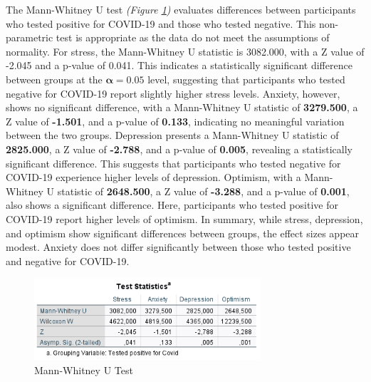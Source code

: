 \documentclass[a4paper]{article}
\begin{document}
\vspace{3em}\noindent
The Mann-Whitney U test \textit{(Figure \ref{fig:mannWhitney})} evaluates differences between participants who tested positive for COVID-19 and those who tested negative. This non-parametric test is appropriate as the data do not meet the assumptions of normality.
\vspace{0.5em}\newline
For stress, the Mann-Whitney U statistic is 3082.000, with a Z value of -2.045 and a p-value of 0.041. This indicates a statistically significant difference between groups at the \(\boldsymbol{\alpha =0.05}\) level,
suggesting that participants who tested negative for COVID-19 report slightly higher stress levels.
\vspace{0.5em}\newline
Anxiety, however, shows no significant difference, with a Mann-Whitney U statistic of \textbf{3279.500}, a Z value of \textbf{-1.501}, and a p-value of \textbf{0.133}, indicating no meaningful variation between the two groups.
Depression presents a Mann-Whitney U statistic of \textbf{2825.000}, a Z value of \textbf{-2.788}, and a p-value of \textbf{0.005}, revealing a statistically significant difference.
This suggests that participants who tested negative for COVID-19 experience higher levels of depression.
\vspace{0.5em}\newline
Optimism, with a Mann-Whitney U statistic of \textbf{2648.500}, a Z value of \textbf{-3.288}, and a p-value of \textbf{0.001}, also shows a significant difference.
Here, participants who tested positive for COVID-19 report higher levels of optimism.
\vspace{0.5em}\newline
In summary, while stress, depression, and optimism show significant differences between groups, the effect sizes appear modest. Anxiety does not differ significantly between those who tested positive and negative for COVID-19.

\begin{figure}[ht]
  \centering
  \caption{Mann-Whitney U Test}
  \label{fig:mannWhitney}
  \includegraphics[width=0.75\textwidth]{img/mann-whitney.png}  %
\end{figure}
\end{document}
